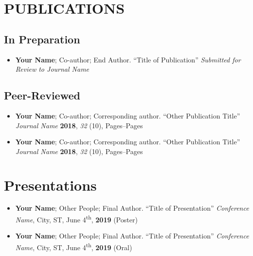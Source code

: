 \documentclass[11pt]{article}
\begin{document}

\section*{PUBLICATIONS}

\subsection*{In Preparation}

\begin{itemize}[label={},itemsep=7pt]

\item \textbf{Your Name}; Co-author; End Author.
``Title of Publication''
\textit{Submitted for Review to Journal Name}

\end{itemize}

\subsection*{Peer-Reviewed}

\begin{itemize}[label={},itemsep=7pt]

\item \textbf{Your Name}; Co-author; Corresponding author.
``Other Publication Title''
\textit{Journal Name}
\textbf{2018},
\textit{32} (10),
Pages--Pages

\item \textbf{Your Name}; Co-author; Corresponding author.
``Other Publication Title''
\textit{Journal Name}
\textbf{2018},
\textit{32} (10),
Pages--Pages
\end{itemize}


\section*{Presentations}
\begin{itemize}[label={},itemsep=7pt]

\item \textbf{Your Name}; Other People; Final Author.
``Title of Presentation''
\textit{Conference Name},
City, ST,
June 4\textsuperscript{th}, \textbf{2019}
(Poster)

\item \textbf{Your Name}; Other People; Final Author.
``Title of Presentation''
\textit{Conference Name},
City, ST,
June 4\textsuperscript{th}, \textbf{2019}
(Oral)

\end{itemize}
\end{document}
